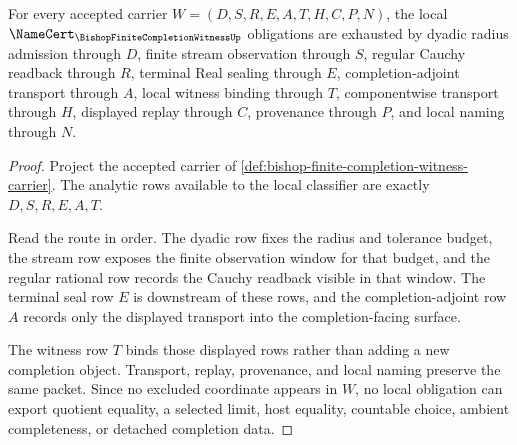\begin{theorem}
\label{thm:bishop-finite-completion-witness-namecert-obligations}
For every accepted carrier $W=(D,S,R,E,A,T,H,C,P,N)$, the local $\NameCert_{\BishopFiniteCompletionWitnessUp}$ obligations are exhausted by dyadic radius admission through $D$, finite stream observation through $S$, regular Cauchy readback through $R$, terminal Real sealing through $E$, completion-adjoint transport through $A$, local witness binding through $T$, componentwise transport through $H$, displayed replay through $C$, provenance through $P$, and local naming through $N$.
\end{theorem}
\begin{proof}
Project the accepted carrier of \autoref{def:bishop-finite-completion-witness-carrier}. The analytic rows available to the local classifier are exactly $D,S,R,E,A,T$.

Read the route in order. The dyadic row fixes the radius and tolerance budget, the stream row exposes the finite observation window for that budget, and the regular rational row records the Cauchy readback visible in that window. The terminal seal row $E$ is downstream of these rows, and the completion-adjoint row $A$ records only the displayed transport into the completion-facing surface.

The witness row $T$ binds those displayed rows rather than adding a new completion object. Transport, replay, provenance, and local naming preserve the same packet. Since no excluded coordinate appears in $W$, no local obligation can export quotient equality, a selected limit, host equality, countable choice, ambient completeness, or detached completion data.
\end{proof}

